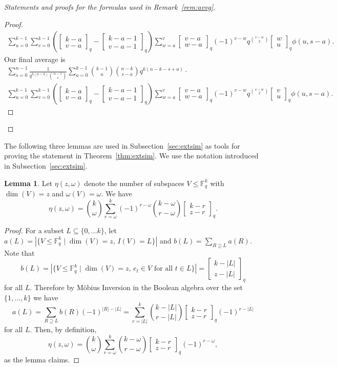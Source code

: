 \documentclass[11pt,a4paper,reqno,twoside]{amsart}
\theoremstyle{definition}
\newtheorem{lemma}{Lemma}
\newcommand{\F}{\mathbb{F}}
\newcommand\qbin[3]{\left[\begin{matrix} #1 \\ #2 \end{matrix}\right]_{#3}}
\begin{document}
\begin{appendix}
\begin{proof}[Statements and proofs for the formulas used in Remark~\ref{rem:avvg}]
\begin{proof}
\begin{multline*}
\sum_{u=0}^{k-1} \sum_{v=0}^{k-1}\left(  \qbin{k-a}{v-a}{q}-\qbin{k-a-1}{v-a-1}{q}\right)\sum_{w=a}^v \qbin{v-a}{w-a}{q} (-1)^{v-w} q^{\binom{v-w}{2}}\qbin{w}{u}{q}\phi(u,s-a).
\end{multline*}
Our final average is
\begin{multline*}
      \sum_{s=0}^{n-1} \frac{1}{q^{k(n-k)}\binom{n-1}{s}} \sum_{a=0}^{k-1} \binom{k-1}{a} 
\binom{n-k}{s-a} q^{k(n-k-s+a)}\cdot \\\sum_{u=0}^{k-1} \sum_{v=0}^{k-1}\left(  \qbin{k-a}{v-a}{q}-\qbin{k-a-1}{v-a-1}{q}\right)\sum_{w=a}^v \qbin{v-a}{w-a}{q} (-1)^{v-w} q^{\binom{v-w}{2}}\qbin{v}{u}{q}\phi(u,s-a).
\end{multline*}
\end{proof}
\phantom\qedhere 
\end{proof}

The following three lemmas are used in Subsection~\ref{sec:extsim} as tools for proving the statement in Theorem~\ref{thm:extsim}. We use the notation introduced in Subsection~\ref{sec:extsim}.

\begin{lemma} \label{lemm1}
    Let $\eta(z,\omega)$ denote the number of subspaces $V \le \F_q^k$ with $\dim(V)=z$
    and $\omega(V)=\omega$. We have
    $$\eta(z,\omega)=\binom{k}{\omega}\sum_{r=\omega}^k (-1)^{r-\omega} \binom{k-\omega}{r-\omega}\qbin{k-r}{z-r}{q}.$$
\end{lemma}
\begin{proof}
For a subset $L \subseteq \{0, \ldots k\}$, let
$a(L)=|\{V \le \F_q^k \mid \dim(V)=z, \, I(V)=L\}|$ and 
$b(L)=\sum_{R \supseteq L} a(R)$.
Note that $$b(L)=|\{V \le \F_q^k \mid \dim(V)=z, \, e_t \in V \mbox{ for all } t \in L\}|=\qbin{k-|L|}{z-|L|}{q}$$
for all $L$. Therefore by Möbius Inversion in the Boolean algebra over the set $\{1, \ldots, k\}$ we have 
$$a(L)=\sum_{R \supseteq L} b(R)(-1)^{|R|-|L|}
=\sum_{r=|L|}^k \binom{k-|L|}{r-|L|}\qbin{k-r}{z-r}{q}(-1)^{r-|L|}$$
for all $L$.
Then, by definition,
$$\eta(z,\omega)= \binom{k}{\omega}\sum_{r=\omega}^k \binom{k-\omega}{r-\omega}\qbin{k-r}{z-r}{q}(-1)^{r-\omega},$$
as the lemma claims.
\end{proof}



\end{appendix}
\end{document}
